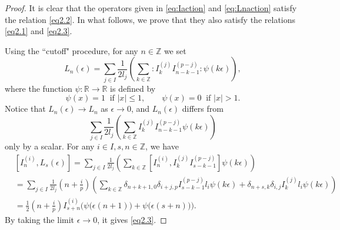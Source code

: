 \documentclass[12pt, reqno]{amsart}
\numberwithin{equation}{section}
\numberwithin{equation}{section}
\def\ep{\epsilon}
\def\dt{\delta}
\newcommand{\R}{\mathbb{R}}
\newcommand{\Z}{\mathbb{Z}}
\newcommand{\elei}[2]{I_{#1}^{(#2)}}
\begin{document}
\begin{proof}
 It is clear that the operators given in \eqref{eq:Iaction} and \eqref{eq:Lnaction} satisfy the relation \eqref{eq2.2}.
 In what follows, we prove that they also satisfy the relations \eqref{eq2.1} and \eqref{eq2.3}.


 Using the ``cutoff" procedure,  for any $n\in\Z$ we set
 $$L_n(\ep)=\sum_{j\in I}\frac{1}{2l_j}\left(\sum_{k\in \Z} :\elei kj\elei{n-k-1}{p-j}:\psi(k\ep)\right),$$
 where the function $\psi:\R\longrightarrow\R$ is defined by
 $$\psi(x)=1\ \text{ if }|x|\leq 1,\qquad \psi(x)=0\ \text{ if }|x|> 1.$$
 Notice that $L_n(\ep)\rightarrow L_n$ as $\ep\rightarrow0$, and $L_n(\ep)$ differs from
 $$\sum_{j\in I}\frac{1}{2l_j}\left(\sum_{k\in \Z} \elei kj\elei{n-k-1}{p-j}\psi(k\ep)\right)$$
 only by a scalar. For any $i\in I,s,n\in\Z$, we have
 \begin{align*}
  &[\elei ni,L_s(\ep)]=\sum_{j\in I}\frac{1}{2l_j}\left(\sum_{k\in \Z}
    [\elei ni,\elei kj\elei{s-k-1}{p-j}]\psi(k\ep)\right)\\
  &=\sum_{j\in I}\frac{1}{2l_j}(n+\frac ip)\left(\sum_{k\in \Z}
       \dt_{n+k+1,0}\dt_{i+j,p}\elei{s-k-1}{p-j}l_i\psi(k\ep)+
         \dt_{n+s,k}\dt_{i,j}\elei{k}{j}l_i\psi(k\ep)  \right)\\
  &=\frac12(n+\frac ip)\elei {s+n}i\Big(\psi\big(\ep(n+1)\big)+\psi\big(\ep(s+n)\big)\Big).
 \end{align*}
 By taking the limit $\ep\rightarrow0$, it gives \eqref{eq2.3}.


\end{proof}
\end{document}
